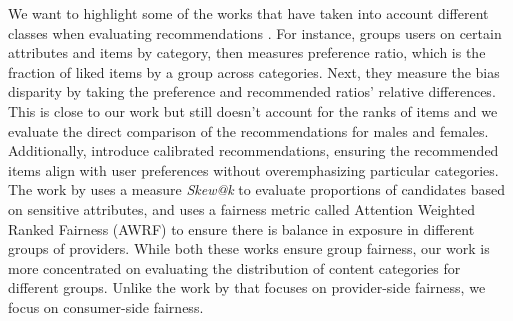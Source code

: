 We want to highlight some of the works that have taken into account different classes when evaluating recommendations \cite{lin2019crankvolumepreferencebias,10.1145/3240323.3240372,10.1145/3292500.3330691,10.1145/3626772.3657794,10068703,10.1145/3308560.3317595,10.1145/3038912.3052612,10.1145/3589334.3648158}.
For instance, \cite{lin2019crankvolumepreferencebias} groups users on certain attributes and items by category, then measures preference ratio, which is the fraction of liked items by a group across categories. Next, they measure the bias disparity by taking the preference and recommended ratios' relative differences. This is close to our work but still doesn't account for the ranks of items and we evaluate the direct comparison of the recommendations for males and females. Additionally, \cite{10.1145/3240323.3240372} introduce calibrated recommendations, ensuring the recommended items align with user preferences without overemphasizing particular categories. The work by \cite{10.1145/3292500.3330691} uses a measure \textit{Skew@k} to evaluate proportions of candidates based on sensitive attributes, and \cite{10.1145/3626772.3657794} uses a fairness metric called Attention Weighted Ranked Fairness (AWRF) \cite{10.1145/3308560.3317595} to ensure there is balance in exposure in different groups of providers. While both these works ensure group fairness, our work is more concentrated on evaluating the distribution of content categories for different groups. Unlike the work by \cite{10.1145/3626772.3657794} that focuses on provider-side fairness, we focus on consumer-side fairness.